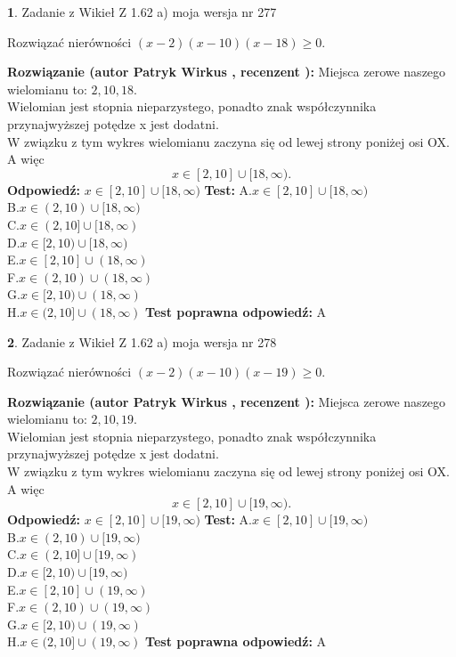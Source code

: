 \documentclass[12pt, a4paper]{article}
\theoremstyle{definition} %
\newtheorem{zad}{}
\newcommand{\zadStart}[1]{\begin{zad}#1\newline}
\newcommand{\zadStop}{\end{zad}}
\newcommand{\rozwStart}[2]{\noindent \textbf{Rozwiązanie (autor #1 , recenzent #2): }\newline}
\newcommand{\rozwStop}{\newline}
\newcommand{\odpStart}{\noindent \textbf{Odpowiedź:}\newline}
\newcommand{\odpStop}{\newline}
\newcommand{\testStart}{\noindent \textbf{Test:}\newline}
\newcommand{\testStop}{\newline}
\newcommand{\kluczStart}{\noindent \textbf{Test poprawna odpowiedź:}\newline}
\newcommand{\kluczStop}{\newline}
\begin{document}
\zadStart{Zadanie z Wikieł Z 1.62 a) moja wersja nr 277}

Rozwiązać nierówności $(x-2)(x-10)(x-18)\ge0$.
\zadStop
\rozwStart{Patryk Wirkus}{}
Miejsca zerowe naszego wielomianu to: $2, 10, 18$.\\
Wielomian jest stopnia nieparzystego, ponadto znak współczynnika przy\linebreak najwyższej potędze x jest dodatni.\\ W związku z tym wykres wielomianu zaczyna się od lewej strony poniżej osi OX. A więc $$x \in [2,10] \cup [18,\infty).$$
\rozwStop
\odpStart
$x \in [2,10] \cup [18,\infty)$
\odpStop
\testStart
A.$x \in [2,10] \cup [18,\infty)$\\
B.$x \in (2,10) \cup [18,\infty)$\\
C.$x \in (2,10] \cup [18,\infty)$\\
D.$x \in [2,10) \cup [18,\infty)$\\
E.$x \in [2,10] \cup (18,\infty)$\\
F.$x \in (2,10) \cup (18,\infty)$\\
G.$x \in [2,10) \cup (18,\infty)$\\
H.$x \in (2,10] \cup (18,\infty)$
\testStop
\kluczStart
A
\kluczStop



\zadStart{Zadanie z Wikieł Z 1.62 a) moja wersja nr 278}

Rozwiązać nierówności $(x-2)(x-10)(x-19)\ge0$.
\zadStop
\rozwStart{Patryk Wirkus}{}
Miejsca zerowe naszego wielomianu to: $2, 10, 19$.\\
Wielomian jest stopnia nieparzystego, ponadto znak współczynnika przy\linebreak najwyższej potędze x jest dodatni.\\ W związku z tym wykres wielomianu zaczyna się od lewej strony poniżej osi OX. A więc $$x \in [2,10] \cup [19,\infty).$$
\rozwStop
\odpStart
$x \in [2,10] \cup [19,\infty)$
\odpStop
\testStart
A.$x \in [2,10] \cup [19,\infty)$\\
B.$x \in (2,10) \cup [19,\infty)$\\
C.$x \in (2,10] \cup [19,\infty)$\\
D.$x \in [2,10) \cup [19,\infty)$\\
E.$x \in [2,10] \cup (19,\infty)$\\
F.$x \in (2,10) \cup (19,\infty)$\\
G.$x \in [2,10) \cup (19,\infty)$\\
H.$x \in (2,10] \cup (19,\infty)$
\testStop
\kluczStart
A
\kluczStop
\end{document}
